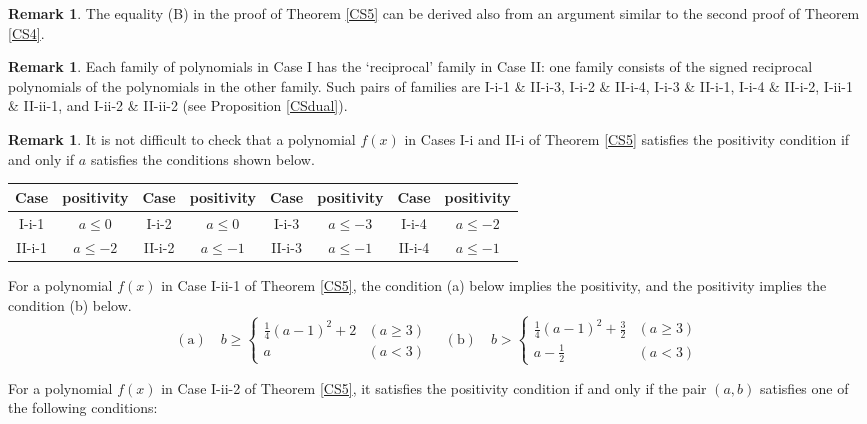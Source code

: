 \documentclass{amsart}
\theoremstyle{plain}
\theoremstyle{definition}
\newtheorem{rem}[thm]{Remark}
\theoremstyle{remark}
\begin{document}
\begin{rem}
The equality (B) in the proof of Theorem \ref{CS5} can be derived also from an argument similar to 
the second proof of Theorem \ref{CS4}. 
\end{rem}

\begin{rem}
Each family of polynomials in Case I has the `reciprocal' family in Case II: 
one family consists of the signed reciprocal polynomials of the polynomials in the other family. 
Such pairs of families are I-i-1 \& II-i-3, I-i-2 \& II-i-4, I-i-3 \& II-i-1, I-i-4 \& II-i-2, I-ii-1 \& II-ii-1, and 
I-ii-2 \& II-ii-2 (see Proposition \ref{CSdual}). 
\end{rem}

\begin{rem}
It is not difficult to check that 
a polynomial $f(x)$ in Cases I-i and II-i of Theorem \ref{CS5} satisfies the positivity condition 
if and only if $a$ satisfies the conditions shown below. 

\medskip

\begin{center}
\noindent
\begin{tabular}{|c|c||c|c||c|c||c|c|} \hline 
Case & positivity & Case & positivity & Case & positivity & Case & positivity \\ \hline 
I-i-1 & $a\leq 0$ & 
I-i-2 & $a\leq 0$ & 
I-i-3 & $a\leq -3$ & 
I-i-4 & $a\leq -2$ \\ \hline
II-i-1 & $a\leq -2$ & 
II-i-2 & $a\leq -1$ & 
II-i-3 & $a\leq -1$ & 
II-i-4 & $a\leq -1$ \\ \hline
\end{tabular} 
\end{center}

\medskip

For a polynomial $f(x)$ in Case I-ii-1 of Theorem \ref{CS5}, 
the condition (a) below implies the positivity, 
and the positivity implies the condition (b) below. 
\[
\mathrm{(a)} \quad  
b \geq 
\begin{cases}
\frac{1}{4}(a-1)^2+2 & (a\geq 3) \\
a & (a<3) 
\end{cases}
\quad 
\mathrm{(b)} \quad  
b > 
\begin{cases}
\frac{1}{4}(a-1)^2+\frac{3}{2} & (a\geq 3) \\
a-\frac{1}{2} & (a<3) 
\end{cases}
\]

For a polynomial $f(x)$ in Case I-ii-2 of Theorem \ref{CS5}, 
it satisfies the positivity condition if and only if the pair $(a,b)$ satisfies one of the following conditions: 


\end{rem}
\end{document}
